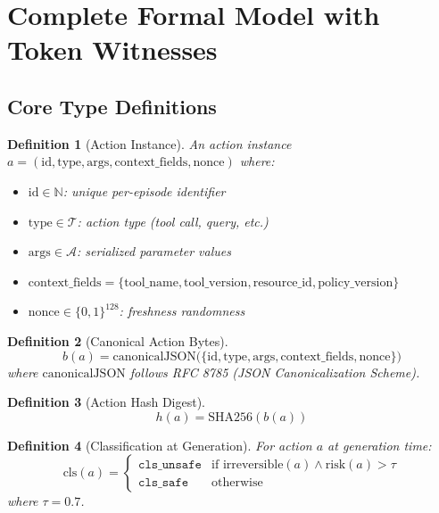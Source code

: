 \documentclass[12pt]{article}
\newtheorem{definition}{Definition}[section]
\begin{document}
\section{Complete Formal Model with Token Witnesses}

\subsection{Core Type Definitions}

\begin{definition}[Action Instance]
An action instance $a = (\text{id}, \text{type}, \text{args}, \text{context\_fields}, \text{nonce})$ where:
\begin{itemize}
    \item $\text{id} \in \mathbb{N}$: unique per-episode identifier
    \item $\text{type} \in \mathcal{T}$: action type (tool call, query, etc.)
    \item $\text{args} \in \mathcal{A}$: serialized parameter values
    \item $\text{context\_fields} = \{\text{tool\_name}, \text{tool\_version}, \text{resource\_id}, \text{policy\_version}\}$
    \item $\text{nonce} \in \{0,1\}^{128}$: freshness randomness
\end{itemize}
\end{definition}

\begin{definition}[Canonical Action Bytes]
\[
b(a) = \mathrm{canonicalJSON}\big(\{\text{id}, \text{type}, \text{args}, \text{context\_fields}, \text{nonce}\}\big)
\]
where $\mathrm{canonicalJSON}$ follows RFC 8785 (JSON Canonicalization Scheme).
\end{definition}

\begin{definition}[Action Hash Digest]
\[
h(a) = \mathrm{SHA256}(b(a))
\]
\end{definition}

\begin{definition}[Classification at Generation]
For action $a$ at generation time:
\[
\mathrm{cls}(a) = 
\begin{cases}
\texttt{cls\_unsafe} & \text{if } \text{irreversible}(a) \land \text{risk}(a) > \tau \\
\texttt{cls\_safe} & \text{otherwise}
\end{cases}
\]
where $\tau=0.7$.
\end{definition}
\end{document}
